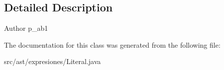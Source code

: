 \subsection{Detailed Description}
\begin{DoxyAuthor}{Author}
p\+\_\+ab1 
\end{DoxyAuthor}


The documentation for this class was generated from the following file\+:\begin{DoxyCompactItemize}
\item 
src/ast/expresiones/Literal.\+java\end{DoxyCompactItemize}
